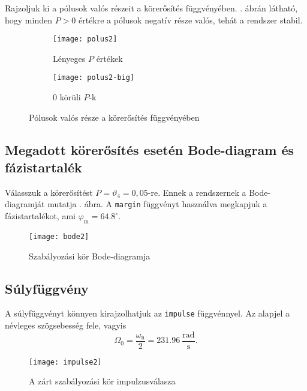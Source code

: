 Rajzoljuk ki a pólusok valós részeit a körerősítés függvényében.
. ábrán látható, hogy minden $P>0$ értékre a pólusok
negatív része valós, tehát a rendszer stabil.
\begin{figure}[H]
	\centering
	\begin{subfigure}{.49\textwidth}
		\texttt{[image: polus2]}
		\caption{Lényeges $P$ értékek}
	\end{subfigure}
	\begin{subfigure}{.49\textwidth}
		\texttt{[image: polus2-big]}
		\caption{0 körüli $P$-k}
	\end{subfigure}
	\caption{Pólusok valós része a körerősítés függvényében}
	\label{fig:poles2}
\end{figure}


\subsection{Megadott körerősítés esetén Bode-diagram és fázistartalék}

Válasszuk a körerősítést $P=\vartheta_4 = 0,05$-re.
Ennek a rendszernek a Bode-diagramját mutatja . ábra.
A \verb|margin| függvényt használva megkapjuk a fázistartalékot,
ami $\varphi_\text{m}=64.8^\circ$.

\begin{figure}[H]
	\centering
	\texttt{[image: bode2]}
	\caption{Szabályozási kör Bode-diagramja}
	\label{fig:bode2}
\end{figure}


\subsection{Súlyfüggvény}

A súlyfüggvényt könnyen kirajzolhatjuk az \verb|impulse| függvénnyel. Az alapjel
a névleges szögsebesség fele, vagyis
\begin{equation}
	\Omega_0 = \frac{\omega_\text{n}}{2} = 231.96~\frac{\text{rad}}{\text{s}}.
\end{equation}

\begin{figure}[H]
	\centering
	\texttt{[image: impulse2]}
	\caption{A zárt szabályozási kör impulzusválasza}
	\label{fig:impulse2}
\end{figure}

